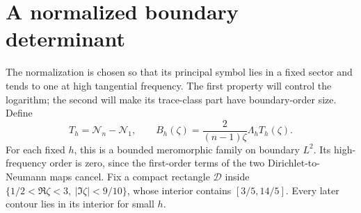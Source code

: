 \documentclass[11pt,a4paper]{article}
\theoremstyle{remark}
\numberwithin{equation}{section}
\begin{document}
\section{A normalized boundary determinant}\label{sec:det}

The normalization is chosen so that its principal symbol lies in a fixed
sector and tends to one at high tangential frequency. The first property
will control the logarithm; the second will make its trace-class part
have boundary-order size. Define
\begin{equation}\label{eq:B}
 T_h=\mathcal N_n-\mathcal N_1,\qquad
 B_h(\zeta)=\frac{2}{(n-1)\zeta}\Lambda_hT_h(\zeta).
\end{equation}
For each fixed $h$, this is a bounded meromorphic family on boundary
$L^2$. Its high-frequency order is zero, since the first-order terms of
the two Dirichlet-to-Neumann maps cancel. Fix a compact rectangle
$\mathcal D$ inside
$\{1/2<\Re\zeta<3,\ |\Im\zeta|<9/10\}$, whose interior contains
$[3/5,14/5]$. Every later contour lies in its interior for small $h$.
\end{document}
